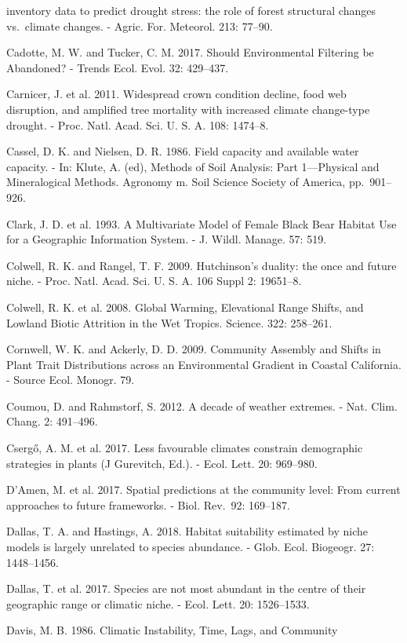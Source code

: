 \documentclass[11pt,twoside]{reedthesis}
\begin{document}
inventory data to predict drought stress: the role of forest structural
changes vs.~climate changes. - Agric. For. Meteorol. 213: 77--90.\par
Cadotte, M. W. and Tucker, C. M. 2017. Should Environmental Filtering be
Abandoned? - Trends Ecol. Evol. 32: 429--437.\par
Carnicer, J. et al. 2011. Widespread crown condition decline, food web
disruption, and amplified tree mortality with increased climate
change-type drought. - Proc. Natl. Acad. Sci. U. S. A. 108: 1474--8.\par
Cassel, D. K. and Nielsen, D. R. 1986. Field capacity and available
water capacity. - In: Klute, A. (ed), Methods of Soil Analysis: Part
1---Physical and Mineralogical Methods. Agronomy m. Soil Science Society
of America, pp.~901--926.\par
Clark, J. D. et al. 1993. A Multivariate Model of Female Black Bear
Habitat Use for a Geographic Information System. - J. Wildl. Manage. 57:
519.\par
Colwell, R. K. and Rangel, T. F. 2009. Hutchinson's duality: the once
and future niche. - Proc. Natl. Acad. Sci. U. S. A. 106 Suppl 2:
19651--8.\par
Colwell, R. K. et al. 2008. Global Warming, Elevational Range Shifts,
and Lowland Biotic Attrition in the Wet Tropics. Science. 322:
258--261.\par
Cornwell, W. K. and Ackerly, D. D. 2009. Community Assembly and Shifts
in Plant Trait Distributions across an Environmental Gradient in Coastal
California. - Source Ecol. Monogr. 79.\par
Coumou, D. and Rahmstorf, S. 2012. A decade of weather extremes. - Nat.
Clim. Chang. 2: 491--496.\par
Csergő, A. M. et al. 2017. Less favourable climates constrain
demographic strategies in plants (J Gurevitch, Ed.). - Ecol. Lett. 20:
969--980.\par
D'Amen, M. et al. 2017. Spatial predictions at the community level: From
current approaches to future frameworks. - Biol. Rev.~92: 169--187.\par
Dallas, T. A. and Hastings, A. 2018. Habitat suitability estimated by
niche models is largely unrelated to species abundance. - Glob. Ecol.
Biogeogr. 27: 1448--1456.\par
Dallas, T. et al. 2017. Species are not most abundant in the centre of
their geographic range or climatic niche. - Ecol. Lett. 20:
1526--1533.\par
Davis, M. B. 1986. Climatic Instability, Time, Lags, and Community
\end{document}
